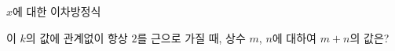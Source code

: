 $x$에 대한 이차방정식\par\smallskip{}\par\smallskip\noindent 이 $k$의 값에 관계없이 항상 $2$를 근으로 가질 때, 상수 $m$, $n$에 대하여 $m+n$의 값은?
